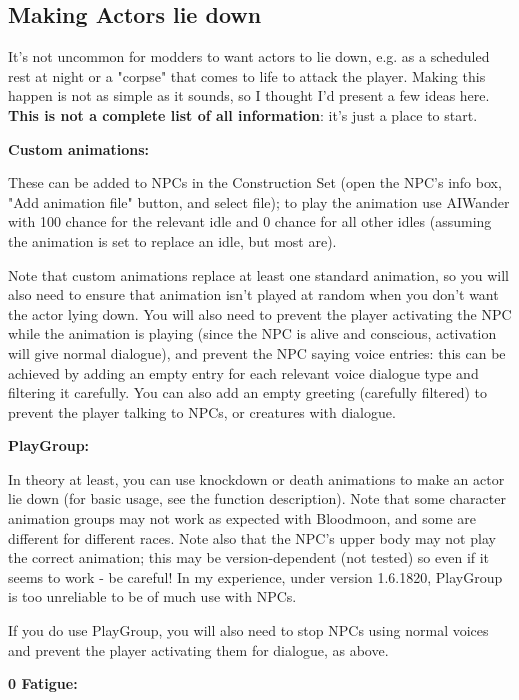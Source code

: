 \hypertarget{making-actors-lie-down}{%
\subsection{Making Actors lie down}\label{making-actors-lie-down}}

It's not uncommon for modders to want actors to lie down, e.g. as a
scheduled rest at night or a "corpse" that comes to life to attack the
player. Making this happen is not as simple as it sounds, so I thought
I'd present a few ideas here. \textbf{This is not a complete list of all
information}: it's just a place to start.

\textbf{Custom animations:}

These can be added to NPCs in the Construction Set (open the NPC's info
box, "Add animation file" button, and select file); to play the
animation use AIWander with 100 chance for the relevant idle and 0
chance for all other idles (assuming the animation is set to replace an
idle, but most are).

Note that custom animations replace at least one standard animation, so
you will also need to ensure that animation isn't played at random when
you don't want the actor lying down. You will also need to prevent the
player activating the NPC while the animation is playing (since the NPC
is alive and conscious, activation will give normal dialogue), and
prevent the NPC saying voice entries: this can be achieved by adding an
empty entry for each relevant voice dialogue type and filtering it
carefully. You can also add an empty greeting (carefully filtered) to
prevent the player talking to NPCs, or creatures with dialogue.

\textbf{PlayGroup:}

In theory at least, you can use knockdown or death animations to make an
actor lie down (for basic usage, see the function description). Note
that some character animation groups may not work as expected with
Bloodmoon, and some are different for different races. Note also that
the NPC's upper body may not play the correct animation; this may be
version-dependent (not tested) so even if it seems to work - be careful!
In my experience, under version 1.6.1820, PlayGroup is too unreliable to
be of much use with NPCs.

If you do use PlayGroup, you will also need to stop NPCs using normal
voices and prevent the player activating them for dialogue, as above.

\textbf{0 Fatigue:}

